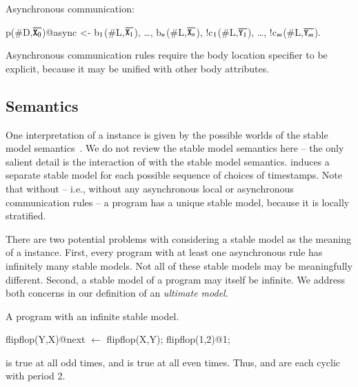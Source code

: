 Asynchronous communication:

\begin{Dedalus}
p(#D,\(\overline{\dedalus{X}\sb{0}}\))@async <- b\(\sb{1}\)(#L,\(\overline{\dedalus{X}\sb{1}}\)), \ldots, b\(\sb{n}\)(#L,\(\overline{\dedalus{X}\sb{n}}\)),
!c\(\sb{1}\)(#L,\(\overline{\dedalus{Y}\sb{1}}\)), \ldots, !c\(\sb{m}\)(#L,\(\overline{\dedalus{Y}\sb{m}}\)).
\end{Dedalus}

Asynchronous communication rules require the body location specifier to be explicit, because it may be unified with other body attributes.





\subsection{Semantics}
One interpretation of a \lang instance is given by the possible worlds of the
stable model semantics~\cite{stable-model}.  We do not review the stable model
semantics here -- the only salient detail is the interaction of 
with the stable model semantics.   induces a separate stable
model for each possible sequence of choices of timestamps.  Note that without
 -- i.e., without any asynchronous local or asynchronous
communication rules -- a \lang program has a unique stable model, because it is
locally stratified.

There are two potential problems with considering a stable model as the meaning of a \lang instance.  First, every program with at least one asynchronous rule has infinitely many stable models.  Not all of these stable models may be meaningfully different.  Second, a stable model of a \lang program may itself be infinite.  We address both concerns in our definition of an {\em ultimate model}.

\begin{example}
\label{ex:flipflop}
A \lang program with an infinite stable model.

\begin{Dedalus}
flipflop(Y,X)@next \(\leftarrow\) flipflop(X,Y);
flipflop(1,2)@1;
\end{Dedalus}

 is true at all odd times, and  is true at all even times.  Thus,  and  are each cyclic with period 2.
\end{example}


